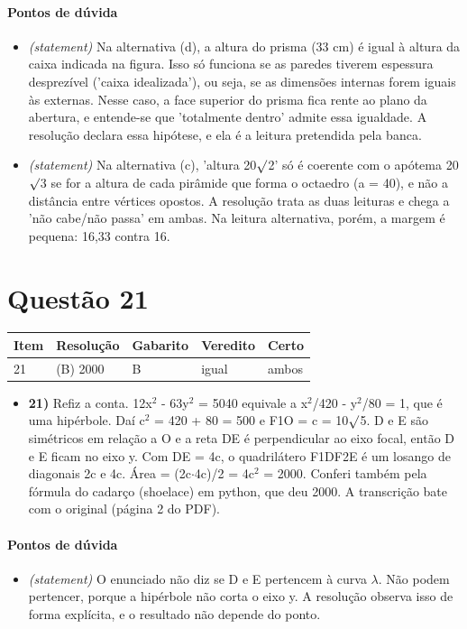 \documentclass{article}%
\begin{document}
\paragraph{Pontos de dúvida}%
\begin{itemize}%
\item%
\textit{(statement)} Na alternativa (d), a altura do prisma (33 cm) é igual à altura da caixa indicada na figura. Isso só funciona se as paredes tiverem espessura desprezível ('caixa idealizada'), ou seja, se as dimensões internas forem iguais às externas. Nesse caso, a face superior do prisma fica rente ao plano da abertura, e entende{-}se que 'totalmente dentro' admite essa igualdade. A resolução declara essa hipótese, e ela é a leitura pretendida pela banca.%
\item%
\textit{(statement)} Na alternativa (c), 'altura 20$\surd$2' só é coerente com o apótema 20$\surd$3 se for a altura de cada pirâmide que forma o octaedro (a = 40), e não a distância entre vértices opostos. A resolução trata as duas leituras e chega a 'não cabe/não passa' em ambas. Na leitura alternativa, porém, a margem é pequena: 16,33 contra 16.%
\end{itemize}%
\section*{Questão 21}%
\begin{longtable}{@{}p{} p{} p{} p{} p{}@{}}\toprule Item & Resolução & Gabarito & Veredito & Certo \\ \midrule
21 & (B) 2000 & B & igual & ambos \\
\bottomrule\end{longtable}%
\begin{itemize}%
\item%
\textbf{21)} Refiz a conta. 12x$^2$ - 63y$^2$ = 5040 equivale a x$^2$/420 - y$^2$/80 = 1, que é uma hipérbole. Daí c$^2$ = 420 + 80 = 500 e F1O = c = 10$\surd$5. D e E são simétricos em relação a O e a reta DE é perpendicular ao eixo focal, então D e E ficam no eixo y. Com DE = 4c, o quadrilátero F1DF2E é um losango de diagonais 2c e 4c. Área = (2c$\cdot$4c)/2 = 4c$^2$ = 2000. Conferi também pela fórmula do cadarço (shoelace) em python, que deu 2000. A transcrição bate com o original (página 2 do PDF).%
\end{itemize}%
\paragraph{Pontos de dúvida}%
\begin{itemize}%
\item%
\textit{(statement)} O enunciado não diz se D e E pertencem à curva $\lambda$. Não podem pertencer, porque a hipérbole não corta o eixo y. A resolução observa isso de forma explícita, e o resultado não depende do ponto.%
\end{itemize}%
\end{document}
